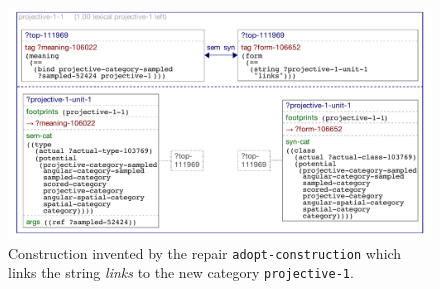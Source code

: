 \begin{figure}
\begin{center}
\includegraphics[width=1\columnwidth]{figs/category-acquisition-projective-adopted-cxn-left}
\end{center}
\caption[Construction invented by the repair {\footnotesize\tt adopt-construction}]{Construction invented by the repair {\footnotesize\tt adopt-construction} 
which links the string \textit{links} to the new category {\footnotesize\tt projective-1}.}
\label{f:category-acquisition-projective-single-acquisition-cxn}
\end{figure}


